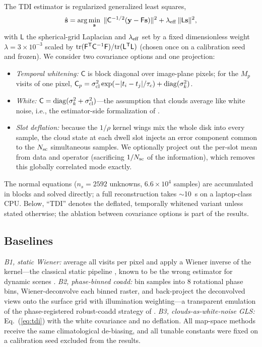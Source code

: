 ﻿\documentclass[twocolumn,10pt]{article}
\begin{document}
The TDI estimator is regularized generalized least squares,
\begin{equation}
\hat{\mathbf{s}}=\arg\min_{\mathbf{s}}\;
\|\mathsf{C}^{-1/2}(\mathbf{y}-\mathsf{F}\mathbf{s})\|^2
+\lambda_{\rm eff}\,\|\mathsf{L}\mathbf{s}\|^2,
\label{eq:tdi}
\end{equation}
with $\mathsf{L}$ the spherical-grid Laplacian and
$\lambda_{\rm eff}$ set by a fixed dimensionless weight
$\lambda=3\times10^{-3}$ scaled by ${\rm tr}(\mathsf{F}^{\sf T}
\mathsf{C}^{-1}\mathsf{F})/{\rm tr}(\mathsf{L}^{\sf T}\mathsf{L})$
(chosen once on a calibration seed and frozen). We consider two
covariance options and one projection:
\begin{itemize}
\item {\it Temporal whitening:} $\mathsf{C}$ is block diagonal over
image-plane pixels; for the $M_p$ visits of one pixel,
$\mathsf{C}_p=\sigma_{\rm cl}^2\exp(-|t_i-t_j|/\tau_c)
+\mathrm{diag}(\sigma_k^2)$.
\item {\it White:} $\mathsf{C}=\mathrm{diag}
(\sigma_k^2+\sigma_{\rm cl}^2)$---the assumption that clouds average
like white noise, i.e., the estimator-side formalization of
\citet{toth25clouds}.
\item {\it Slot deflation:} because the $1/\rho$ kernel wings mix the
whole disk into every sample, the cloud state at each dwell slot injects
an error component common to the $N_{\rm sc}$ simultaneous samples. We
optionally project out the per-slot mean from data and operator
(sacrificing $1/N_{\rm sc}$ of the information), which removes this
globally correlated mode exactly.
\end{itemize}
The normal equations ($n_s=2592$ unknowns, $6.6\times10^4$ samples) are
accumulated in blocks and solved directly; a full reconstruction takes
$\sim$10~s on a laptop-class CPU. Below, ``TDI'' denotes the deflated,
temporally whitened variant unless stated otherwise; the ablation between
covariance options is part of the results.

\subsection{Baselines}
{\it B1, static Wiener:} average all visits per pixel and apply a Wiener
inverse of the kernel---the classical static pipeline
\citep{toth21}, known to be the wrong estimator for dynamic scenes
\citep{tur26bench}. {\it B2, phase-binned coadd:} bin samples into 8
rotational phase bins, Wiener-deconvolve each binned raster, and
back-project the deconvolved views onto the surface grid with
illumination weighting---a transparent emulation of the
phase-registered robust-coadd strategy of \citet{tur26bench}.
{\it B3, clouds-as-white-noise GLS:} Eq.~(\ref{eq:tdi}) with the white
covariance and no deflation. All map-space methods receive the same
climatological de-biasing, and all tunable constants were fixed on a
calibration seed excluded from the results.
\end{document}
